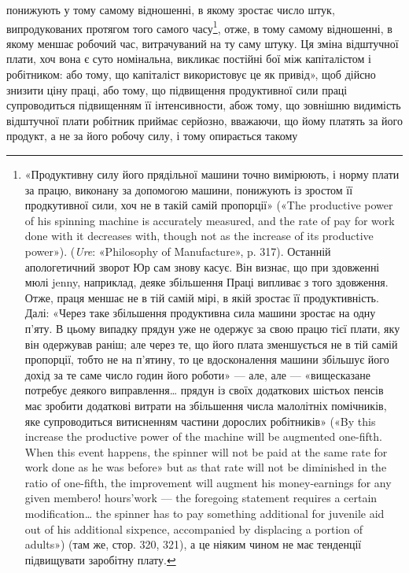 \parcont{}  %
понижують у тому самому відношенні, в якому зростає число
штук, випродукованих протягом того самого часу\footnote{
«Продуктивну силу його прядільної машини точно вимірюють,
і норму плати за працю, виконану за допомогою машини, понижують
із зростом її продкутивної сили, хоч не в такій самій пропорції» («The
productive power of his spinning machine is accurately measured, and the
rate of pay for work done with it decreases with, though not as the increase
of its productive power»). (\emph{Ure}: «Philosophy of Manufacture», p. 317).
Останній апологетичний зворот Юр сам знову касує. Він визнає, що при
здовженні мюлі jenny, наприклад, деяке збільшення Праці випливає
з того здовження. Отже, праця меншає не в тій самій мірі, в якій зростає
її продуктивність. Далі: «Через таке збільшення продуктивна сила машини
зростає на одну п’яту. В цьому випадку прядун уже не одержує
за свою працю тієї плати, яку він одержував раніш; але через те, що його
плата зменшується не в тій самій пропорції, тобто не на п’ятину, то це
вдосконалення машини збільшує його дохід за те саме число годин його
роботи» — але, але — «вищесказане потребує деякого виправлення\dots{}
прядун із своїх додаткових шістьох пенсів має зробити додаткові витрати
на збільшення числа малолітніх помічників, яке супроводиться витисненням
частини дорослих робітників» («By this increase the productive power
of the machine will be augmented one-fifth. When this event happens,
the spinner will not be paid at the same rate for work done as he was before»
but as that rate will not be diminished in the ratio of one-fifth, the improvement
will augment his money-earnings for any given membero! hours’work
— the foregoing statement requires a certain modification\dots{} the spinner
has to pay something additional for juvenile aid out of his additional
sixpence, accompanied by displacing a portion of adults») (там же, стор. 320,
321), а це ніяким чином не має тенденції підвищувати заробітну плату.
}, отже, в тому
самому відношенні, в якому меншає робочий час, витрачуваний
на ту саму штуку. Ця зміна відштучної плати, хоч вона є суто
номінальна, викликає постійні бої між капіталістом і робітником:
або тому, що капіталіст використовує це як привід»,
щоб дійсно знизити ціну праці, або тому, що підвищення продуктивної
сили праці супроводиться підвищенням її інтенсивности,
абож тому, що зовнішню видимість відштучної плати
робітник приймає серйозно, вважаючи, що йому платять за його
продукт, а не за його робочу силу, і тому опирається такому
